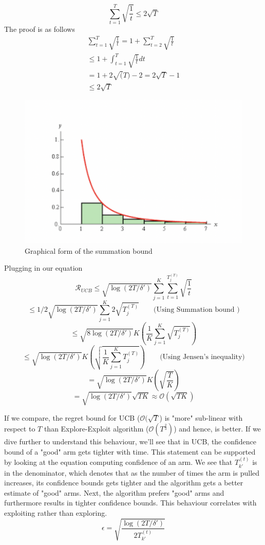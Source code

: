 \documentclass[11pt]{article}
\begin{document}
$$\sum_{t=1}^{T}\sqrt{\frac{1}{t}} \le 2\sqrt{T}$$
The proof is as follows
\begin{align*}
    \sum_{t=1}^{T}\sqrt{\frac{1}{t}} = 1 + \sum_{t=2}^{T}\sqrt{\frac{1}{t}} \\
    \le 1 + \int_{t=1}^{T} \sqrt{\frac{1}{t}}dt \\
    = 1 + 2 \sqrt(T) - 2 = 2 \sqrt{T} - 1 \\
    \le 2 \sqrt{T}
\end{align*}
\begin{figure}[h]
    \centering
    \includegraphics[scale=0.5]{figs/Screen Shot 2022-03-04 at 12.30.28 AM.png}
    \caption{Graphical form of the summation bound}
    \label{fig:my_label}
\end{figure}


\normalfont
Plugging in our equation
$$\mathcal{R}_{UCB} \le \sqrt{\log(2T/\delta')} \sum_{j=1}^K \sum_{t=1}^{T_j^{(T)}} \sqrt{\frac{1}{t}}$$
$$\le 1/2\sqrt{\log(2T/\delta')} \sum_{j=1}^K 2\sqrt{T_j^{(T)}} \qquad \text{(Using Summation bound )}$$
$$\le \sqrt{8\log(2T/\delta')} K \left(\frac{1}{K}\sum_{j=1}^K \sqrt{T_j^{(T)}} \right)$$
$$\le \sqrt{\log(2T/\delta')} K \left( \sqrt{\frac{1}{K}\sum_{j=1}^K T_j^{(T)}} \right)  \qquad \text{(Using Jensen's inequality)}$$
$$= \sqrt{\log(2T/\delta')} K \left( \sqrt{\frac{T}{K}} \right)$$
$$= \sqrt{\log(2T/\delta')} \sqrt{TK} \approx \mathcal{O}(\sqrt{TK})$$

If we compare, the regret bound for UCB ($\mathcal{O}(\sqrt{T}$) is "more" sub-linear with respect to $T$ than Explore-Exploit algorithm ($\mathcal{O}(T^{\frac{2}{3}})$) and hence, is better. If we dive further to understand this behaviour, we'll see that in UCB, the confidence bound of a "good" arm gets tighter with time.  This statement can be supported by looking at the equation computing confidence of an arm. We see that $T_{k'}^{(t)}$ is in the denominator, which denotes that as the number of times the arm is pulled increases, its confidence bounds gets tighter and the algorithm gets a better estimate of "good" arms. Next, the algorithm prefers "good" arms and furthermore results in tighter confidence bounds.
This behaviour correlates with exploiting rather than exploring.
\begin{equation*}
    \epsilon = \sqrt{\frac{\log(2T/\delta')}{2T_{k'}^{(t)}}}
\end{equation*}
\end{document}
